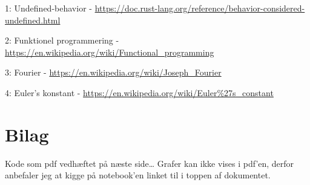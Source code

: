 \documentclass[11pt,a4paper]{article}
\begin{document}
1: Undefined-behavior - \url{https://doc.rust-lang.org/reference/behavior-considered-undefined.html}

2: Funktionel programmering - \url{https://en.wikipedia.org/wiki/Functional\_programming}

3: Fourier - \url{https://en.wikipedia.org/wiki/Joseph\_Fourier}

4: Euler's konstant - \url{https://en.wikipedia.org/wiki/Euler\%27s\_constant}


\section{Bilag}
\label{sec:orgc2164b3}

Kode som pdf vedhæftet på næste side\ldots{}
Grafer kan ikke vises i pdf'en, derfor anbefaler jeg at kigge på notebook'en linket til i toppen af dokumentet.


\end{document}
